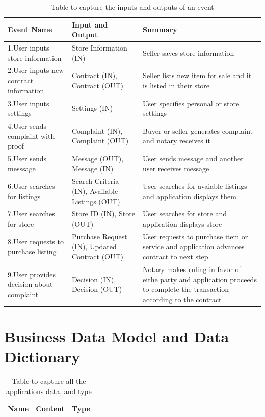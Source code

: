 \documentclass{article}
\begin{document}
\begin{table}[h!]
\color{red}
\centering
\begin{tabu} to 0.8\textwidth {|| X[l] | X[l] | X[l] ||}
 \hline
 \textbf {Event Name} & \textbf{Input and Output} & \textbf{Summary} \\
 \hline
 1.User inputs store information & Store Information (IN) & Seller saves store information \\
 \hline
 2.User inputs new contract information & Contract (IN), Contract (OUT) & Seller lists new item for sale and it is listed in their store \\
 \hline
 3.User inputs settings & Settings (IN) & User specifies personal or store settings \\
 \hline
 4.User sends complaint with proof & Complaint (IN), Complaint (OUT) & Buyer or seller generates complaint and notary receives it \\
 \hline
 5.User sends messsage & Message (OUT), Message (IN) & User sends message and another user receives message \\
 \hline
 6.User searches for listings & Search Criteria (IN), Available Listings (OUT) & User searches for avaiable listings and application displays them \\
 \hline
 7.User searches for store & Store ID (IN), Store (OUT) & User searches for store and application displays store \\
 \hline
 8.User requests to purchase listing & Purchase Request (IN), Updated Contract (OUT) & User requests to purchase item or service and application advances contract to next step \\
 \hline
 9.User provides decision about complaint & Decision (IN), Decision (OUT) & Notary makes ruling in favor of eithe party and application proceeds to complete the transaction according to the contract \\
 \hline
\end{tabu}
\caption{Table to capture the inputs and outputs of an event}
\label{table:2}
\end{table}

\section{Business Data Model and Data Dictionary}

\begin{table}[h!]
\centering
\begin{tabular}{||c c c ||}
 \hline
 \textbf {Name} & \textbf{Content} & \textbf{Type} \\ [0.5ex]
 \hline
\end{tabular}
\caption{Table to capture all the applications data, and type}
\label{table:3}
\end{table}
\end{document}
